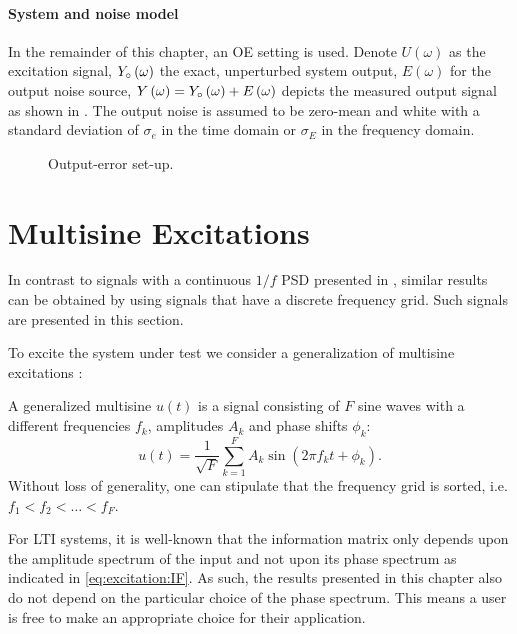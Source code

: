 \paragraph{System and noise model}
  In the remainder of this chapter, an \gls{OE} setting is used.
  Denote
    $U  \left(\omega\right)$ as the excitation signal,
    ${Y}_{\circ}\left(\omega\right)$ the exact, unperturbed system output,
    $E  \left(\omega\right)$ for the output noise source,
    $Y  \left(\omega\right) = {Y}_{\circ}\left( \omega \right) + E\left( \omega \right)$ depicts the measured output signal as shown in .
    The output noise is assumed to be zero-mean and white with a standard deviation of $\sigma_e$ in the time domain or $\sigma_E$ in the frequency domain.

  \begin{figure}[h]
    \centering
    
    \caption[Output-error]{Output-error set-up.}
    \label{fig:excitation:OE}
  \end{figure}

\section{Multisine Excitations}
\label{sec:excitation:multisine}
In contrast to signals with a continuous $1/f$ \gls{PSD} presented in , similar results can be obtained by using signals that have a discrete frequency grid.
Such signals are presented in this section.

  To excite the system under test we consider a generalization of multisine excitations \citep{Pintelon2012}:
  \begin{definition} \label{def:excitation:generalized-MS}
  A generalized multisine $u(t)$ is a signal consisting of $F$ sine waves with a different frequencies $f_k$, amplitudes $A_k$ and phase shifts $\phi_k$:
  \begin{equation}
    u \left( t\right) = \frac{1}{\sqrt{F}}
   \sum_{k=1}^{F} 
     A_k 
     \sin 
       \left(2\pi f_k t + \phi_k \right)
  \text{.}
  \label{eq:excitation:MultisineCT}
  \end{equation}
  Without loss of generality, one can stipulate that the frequency grid is sorted, i.e. $f_1 < f_2 < \ldots < f_F$.
  \end{definition}

  For \gls{LTI} systems, it is well-known that the information matrix only depends upon the amplitude spectrum of the input and not upon its phase spectrum as indicated in \eqref{eq:excitation:IF}.
  As such, the results presented in this chapter also do not depend on the particular choice of the phase spectrum.
  This means a user is free to make an appropriate choice for their application.
  
